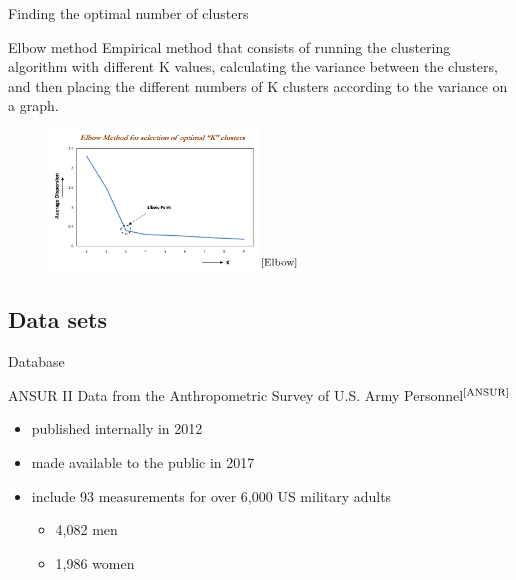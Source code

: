 \documentclass[10pt]{beamer}
\newcommand{\bib}[1]{$^\text{\cite{#1}}$}
\begin{document}
\begin{frame}{Finding the optimal number of clusters}
	\begin{block}{Elbow method}
		Empirical method that consists of running the clustering algorithm with different K values, calculating the variance between the clusters, and then placing the different numbers of K clusters according to the variance on a graph.
	\end{block}
	\begin{figure}[H]
		\centering
		\includegraphics[width=0.5\textwidth]{../Images/Elbow_Method.png}\bib{Elbow}
	\end{figure}
\end{frame}

\subsection{Data sets}
\begin{frame}{Database}
	\begin{block}{ANSUR II}
		Data from the Anthropometric Survey of U.S. Army Personnel\bib{ANSUR}
		\begin{itemize}
			\item published internally in 2012
			\item made available to the public in 2017
			\item include 93 measurements for over 6,000 US military adults
			      \begin{itemize}
				      \item 4,082 men
				      \item 1,986 women
			      \end{itemize}
		\end{itemize}
	\end{block}
\end{frame}
\end{document}

